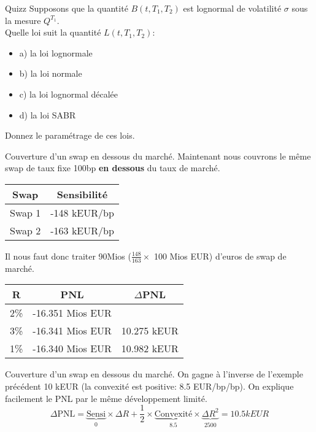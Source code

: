 \documentclass{beamer}
\begin{document}
\begin{frame}{Quizz}
Supposons que la quantité $B(t,T_1,T_2)$ est lognormal de volatilité $\sigma$ sous la mesure $Q^{T_1}$.\\
\vspace{0.5cm}
Quelle loi suit la quantité $L(t,T_1,T_2):$
\begin{itemize}
\item a) la loi lognormale
\item b) la loi normale
\item c) la loi lognormal décalée
\item d) la loi SABR
\end{itemize}
\vspace{0.5cm}
Donnez le paramétrage de ces lois.
\end{frame}


\begin{frame}{Couverture d'un swap en dessous du marché.}
Maintenant nous couvrons le même swap de taux fixe 100bp \textbf{en dessous} du taux de marché.\\
\begin{center}
\begin{tabular}{|c|c|}
\hline
Swap&Sensibilité \\ 
\hline
Swap 1 &-148 kEUR/bp \\ 
Swap 2 &-163 kEUR/bp \\ 
\hline
\end{tabular}
\end{center}
Il nous faut donc traiter 90Mios ($\frac{148}{163} \times$ 100 Mios EUR)  d'euros de swap de marché. 
\begin{center}
\begin{tabular}{|c|c|c|}
\hline
R&PNL&$\Delta$PNL \\ 
\hline
2\% &-16.351 Mios EUR& \\ 
3\% &-16.341 Mios EUR&10.275 kEUR\\ 
1\% &-16.340 Mios EUR&10.982 kEUR\\ 
\hline
\end{tabular}
\end{center}
\end{frame}
\begin{frame}{Couverture d'un swap en dessous du marché.}
On gagne à l'inverse de l'exemple précédent 10 kEUR (la convexité est positive: 8.5 EUR/bp/bp).
On explique facilement le PNL par le même développement limité.
\[
\Delta \text{PNL}=\underbrace{\text{Sensi}}_{0} \times \Delta R + \frac{1}{2} \times \underbrace{\text{Convexité}}_{8.5} \times \underbrace{\Delta R^2}_{2500}=10.5 kEUR
\]
\end{frame}
\end{document}
